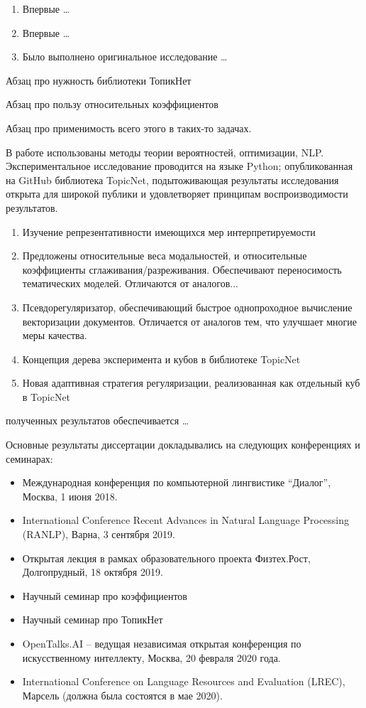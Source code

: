 {\novelty}
\begin{enumerate}[beginpenalty=10000] %
  \item Впервые \ldots
  \item Впервые \ldots
  \item Было выполнено оригинальное исследование \ldots
\end{enumerate}

{\influence} 
Абзац про нужность библиотеки ТопикНет

Абзац про пользу относительных коэффициентов

Абзац про применимость всего этого в таких-то задачах.


{\methods} В работе использованы методы теории вероятностей, оптимизации, NLP. Экспериментальное исследование проводится на языке Python; опубликованная на GitHub библиотека TopicNet, подытоживающая результаты исследования открыта для широкой публики и удовлетворяет принципам воспроизводимости результатов.

{}
\begin{enumerate}[beginpenalty=10000] %
  \item Изучение репрезентативности имеющихся мер интерпретируемости
  \item Предложены относительные веса модальностей, и относительные коэффициенты сглаживания/разреживания. Обеспечивают переносимость тематических моделей. Отличаются от аналогов...
  \item Псевдорегуляризатор, обеспечивающий быстрое однопроходное вычисление векторизации документов. Отличается от аналогов тем, что улучшает многие меры качества.
  \item Концепция дерева эксперимента и кубов в библиотеке TopicNet
  \item Новая адаптивная стратегия регуляризации, реализованная как отдельный куб в TopicNet
\end{enumerate}


{\reliability} полученных результатов обеспечивается \ldots 

{\probation}
Основные результаты диссертации докладывались на следующих конференциях и семинарах:
\begin{itemize}
    \item Международная конференция по компьютерной лингвистике “Диалог”, Москва, 1 июня 2018.
    \item International Conference Recent Advances in Natural Language Processing (RANLP), Варна, 3 сентября 2019.
    \item Открытая лекция в рамках образовательного проекта Физтех.Рост, Долгопрудный, 18 октября 2019.
    \item Научный семинар про коэффициентов
    \item Научный семинар про ТопикНет
    \item OpenTalks.AI – ведущая независимая открытая конференция по искусственному интеллекту, Москва, 20 февраля 2020 года.
    \item International Conference on Language Resources and Evaluation (LREC), Марсель (должна была состоятся в мае 2020).
\end{itemize}

